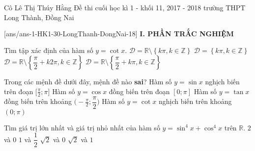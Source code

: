 
	\begin{name}
		{Cô Lê Thị Thúy Hằng}
		{Đề thi cuối học kì 1 - khối 11, 2017 - 2018 trường THPT Long Thành, Đồng Nai}
	\end{name}
	\setcounter{ex}{0}\setcounter{bt}{0}
	[ans/ans-1-HK1-30-LongThanh-DongNai-18]
\noindent\textbf{I. PHẦN TRẮC NGHIỆM}
\begin{ex}%
	Tìm tập xác định của hàm số $y=\cot x$.
	\choice
	{\True $\mathscr{D} = \mathbb{R} \setminus \left\{ k \pi, k \in \mathbb{Z} \right\}$}
	{$\mathscr{D} = \left\{ k \pi, k \in \mathbb{Z} \right\}$}
	{$\mathscr{D} = \mathbb{R} \setminus \left\{ \dfrac{\pi}{2}+ k 2\pi, k \in \mathbb{Z} \right\}$}
	{$\mathscr{D} = \mathbb{R} \setminus \left\{ \dfrac{\pi}{2}+ k \pi, k \in \mathbb{Z} \right\}$}
	
\end{ex}
\begin{ex}%
	Trong các mệnh đề dưới đây, mệnh đề nào \textbf{sai}?
	\choice
	{Hàm số $y = \sin x $ nghịch biến trên đoạn $\bigg[ \displaystyle \frac{\pi}{2}; \pi \bigg]$}
	{\True Hàm số $y = \cos x $ đồng biến trên đoạn $\left[ 0 ; \pi \right]$}
	{Hàm số $y = \tan x $ đồng biến trên khoảng $\bigg(-\displaystyle \frac{\pi}{2}; \dfrac{\pi}{2} \bigg)$}
	{Hàm số $y = \cot x $ nghịch biến trên khoảng $(0; \pi)$ }
\end{ex}
\begin{ex}%
	Tìm giá trị lớn nhất và giá trị nhỏ nhất của hàm số $y = \sin^4 x + \cos^4 x$ trên $\mathbb{R}$.
	\choice
	{$2$ và $0$}
	{\True $1$ và $\dfrac{1}{2}$}
	{$\sqrt{2}$ và $0$}
	{$\sqrt{2}$ và $1$}
\end{ex}
